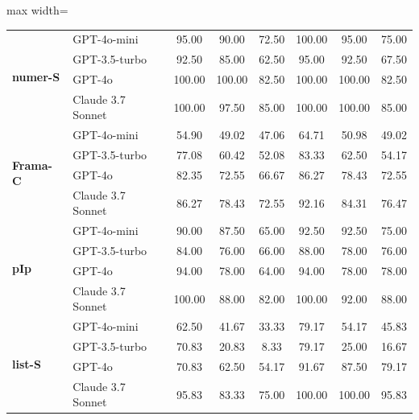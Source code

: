 \begin{table}[t]
\begin{adjustbox}{max width=\linewidth}
\begin{tabular}{ll ccc ccc}
\multirow{4}{*}{\textbf{numer-S}}
 & GPT-4o-mini & 95.00 & 90.00 & 72.50 & 100.00 & 95.00 & 75.00 \\
 & GPT-3.5-turbo & 92.50 & 85.00 & 62.50 & 95.00 & 92.50 & 67.50 \\
 & GPT-4o & 100.00 & 100.00 & 82.50 & 100.00 & 100.00 & 82.50 \\
 & Claude 3.7 Sonnet & 100.00 & 97.50 & 85.00 & 100.00 & 100.00 & 85.00 \\
\midrule

\multirow{4}{*}{\textbf{Frama-C}}
 & GPT-4o-mini & 54.90 & 49.02 & 47.06 & 64.71 & 50.98 & 49.02 \\
 & GPT-3.5-turbo & 77.08 & 60.42 & 52.08 & 83.33 & 62.50 & 54.17 \\
 & GPT-4o & 82.35 & 72.55 & 66.67 & 86.27 & 78.43 & 72.55 \\
 & Claude 3.7 Sonnet & 86.27 & 78.43 & 72.55 & 92.16 & 84.31 & 76.47 \\
\midrule

\multirow{4}{*}{\textbf{pIp}}
 & GPT-4o-mini & 90.00 & 87.50 & 65.00 & 92.50 & 92.50 & 75.00 \\
 & GPT-3.5-turbo & 84.00 & 76.00 & 66.00 & 88.00 & 78.00 & 76.00 \\
 & GPT-4o & 94.00 & 78.00 & 64.00 & 94.00 & 78.00 & 78.00 \\
 & Claude 3.7 Sonnet & 100.00 & 88.00 & 82.00 & 100.00 & 92.00 & 88.00 \\
\midrule

\multirow{4}{*}{\textbf{list-S}}
 & GPT-4o-mini & 62.50 & 41.67 & 33.33 & 79.17 & 54.17 & 45.83 \\
 & GPT-3.5-turbo & 70.83 & 20.83 & 8.33 & 79.17 & 25.00 & 16.67 \\
 & GPT-4o & 70.83 & 62.50 & 54.17 & 91.67 & 87.50 & 79.17 \\
 & Claude 3.7 Sonnet & 95.83 & 83.33 & 75.00 & 100.00 & 100.00 & 95.83 \\
\bottomrule
\end{tabular}
\end{adjustbox}
\end{table}


